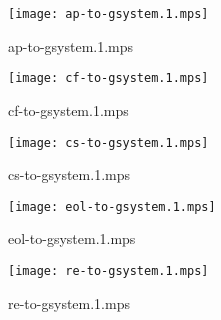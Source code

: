\documentclass[letterpaper,10pt]{article}
\begin{document}
\begin{figure}
    \centering
    \texttt{[image: ap-to-gsystem.1.mps]}
    \caption{ap-to-gsystem.1.mps}
\end{figure}

\begin{figure}
    \centering
    \texttt{[image: cf-to-gsystem.1.mps]}
    \caption{cf-to-gsystem.1.mps}
\end{figure}

\begin{figure}
    \centering
    \texttt{[image: cs-to-gsystem.1.mps]}
    \caption{cs-to-gsystem.1.mps}
\end{figure}

\begin{figure}
    \centering
    \texttt{[image: eol-to-gsystem.1.mps]}
    \caption{eol-to-gsystem.1.mps}
\end{figure}

\begin{figure}
    \centering
    \texttt{[image: re-to-gsystem.1.mps]}
    \caption{re-to-gsystem.1.mps}
\end{figure}
\end{document}
